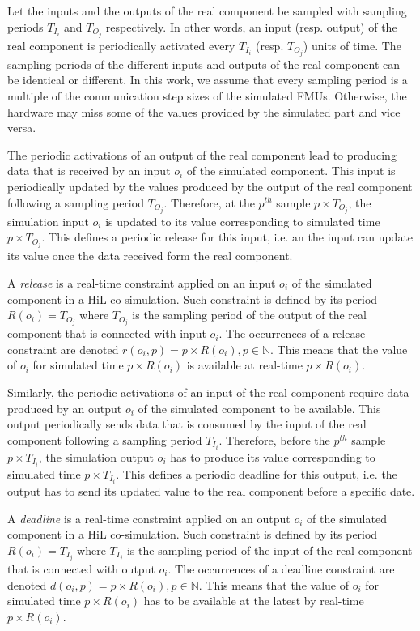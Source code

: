 Let the inputs and the outputs of the real component be sampled with sampling periods $T_{I_i}$ and $T_{O_j}$ respectively. In other words, an input (resp. output) of the real component is periodically activated every $T_{I_i}$ (resp. $T_{O_j}$) units of time. The sampling periods of the different inputs and outputs of the real component can be identical or different. In this work, we assume that every sampling period is a multiple of the communication step sizes of the simulated FMUs. Otherwise, the hardware may miss some of the values provided by the simulated part and vice versa. 

The periodic activations of an output of the real component lead to producing data that is received by an input $o_i$ of the simulated component. This input is periodically updated by the values produced by the output of the real component following a sampling period $T_{O_j}$. Therefore, at the $p^{th}$ sample $p \times T_{O_j}$, the simulation input $o_i$ is updated to its value corresponding to simulated time $p \times T_{O_j}$. This defines a periodic release for this input, i.e. an the input can update its value once the data received form the real component.

\begin{definition}
A \textit{release} is a real-time constraint applied on an input $o_i$ of the simulated component in a HiL co-simulation. Such constraint is defined by its period $R(o_i) = T_{O_j}$ where $T_{O_j}$ is the sampling period of the output of the real component that is connected with input $o_i$. The occurrences of a release constraint are denoted $r(o_i,p) = p \times R(o_i), p \in \mathbb{N}$. This means that the value of $o_i$ for simulated time $p \times R(o_i)$ is available at real-time $p \times R(o_i)$.
\label{def:release}
\end{definition}

Similarly, the periodic activations of an input of the real component require data produced by an output $o_i$ of the simulated component to be available. This output periodically sends data that is consumed by the input of the real component following a sampling period $T_{I_i}$. Therefore, before the $p^{th}$ sample $p \times T_{I_i}$, the simulation output $o_i$ has to produce its value corresponding to simulated time $p \times T_{I_i}$. This defines a periodic deadline for this output, i.e. the output has to send its updated value to the real component before a specific date.

\begin{definition}
A \textit{deadline} is a real-time constraint applied on an output $o_i$ of the simulated component in a HiL co-simulation. Such constraint is defined by its period $R(o_i) = T_{I_j}$ where $T_{I_j}$ is the sampling period of the input of the real component that is connected with output $o_i$. The occurrences of a deadline constraint are denoted $d(o_i,p) = p \times R(o_i), p \in \mathbb{N}$. This means that the value of $o_i$ for simulated time $p \times R(o_i)$ has to be available at the latest by real-time $p \times R(o_i)$.
\label{def:deadline}
\end{definition}

